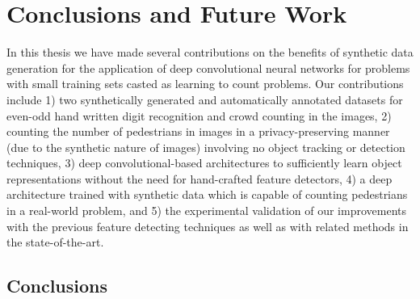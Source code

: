 \newpage

\chapter{Conclusions and Future Work}
\label{sec:conclusions}

\noindent In this thesis we have made several contributions on the benefits of synthetic data generation for the application of deep convolutional neural networks for problems with small training sets casted as learning to count problems. Our contributions include 1) two synthetically generated and automatically annotated datasets for even-odd hand written digit recognition and crowd counting in the images, 2) counting the number of pedestrians in images in a privacy-preserving manner (due to the synthetic nature of images) involving no object tracking or detection techniques, 3) deep convolutional-based architectures to sufficiently learn object representations without the need for hand-crafted feature detectors, 4) a deep architecture trained with synthetic data which is capable of counting pedestrians in a real-world problem, and 5) the experimental validation of our improvements with the previous feature detecting techniques as well as with related methods in the state-of-the-art. 


\section{Conclusions}

